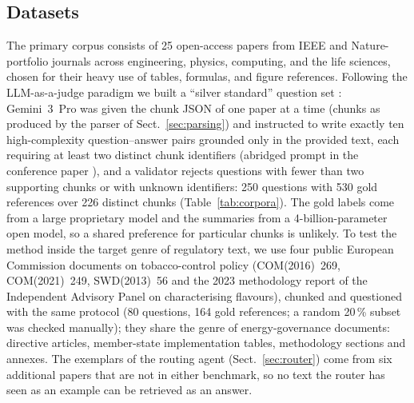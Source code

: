 \documentclass[pdflatex,sn-mathphys-num]{sn-jnl}
\theoremstyle{thmstyleone}%
\theoremstyle{thmstylethree}%
\begin{document}
\subsection{Datasets}\label{sec:datasets}

The primary corpus consists of 25 open-access papers from IEEE and Nature-portfolio journals across engineering, physics, computing, and the life sciences, chosen for their heavy use of tables, formulas, and figure references. Following the LLM-as-a-judge paradigm \cite{zheng2023judgingllmasajudgemtbenchchatbot} we built a ``silver standard'' question set \cite{rebholz2010silverstandard}: Gemini~3~Pro was given the chunk JSON of one paper at a time (chunks as produced by the parser of Sect.~\ref{sec:parsing}) and instructed to write exactly ten high-complexity question--answer pairs grounded only in the provided text, each requiring at least two distinct chunk identifiers (abridged prompt in the conference paper \cite{sandor2025documentslicecontextualretrieval}), and a validator rejects questions with fewer than two supporting chunks or with unknown identifiers: 250 questions with 530 gold references over 226 distinct chunks (Table~\ref{tab:corpora}). The gold labels come from a large proprietary model and the summaries from a 4-billion-parameter open model, so a shared preference for particular chunks is unlikely. To test the method inside the target genre of regulatory text, we use four public European Commission documents on tobacco-control policy (COM(2016)~269, COM(2021)~249, SWD(2013)~56 and the 2023 methodology report of the Independent Advisory Panel on characterising flavours), chunked and questioned with the same protocol (80 questions, 164 gold references; a random 20\,\% subset was checked manually); they share the genre of energy-governance documents: directive articles, member-state implementation tables, methodology sections and annexes. The exemplars of the routing agent (Sect.~\ref{sec:router}) come from six additional papers that are not in either benchmark, so no text the router has seen as an example can be retrieved as an answer.
\end{document}

